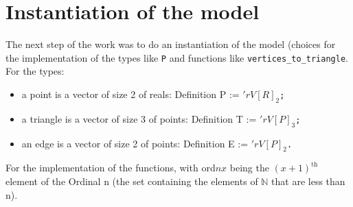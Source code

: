 \documentclass[a4paper,10pt]{article}
\def\definition#1#2{{\color{purple}Definition} {\color{blue}#1} := {\tt #2}}
\begin{document}
\section{Instantiation of the model}
\label{implementation}
The next step of the work was to do an instantiation of the model (choices for the implementation of the types like {\tt P} and functions like {\tt vertices\_to\_triangle}. For the types:
\begin{itemize}
\item a point is a vector of size 2 of reals: \definition{P}{$'rV[R]_2$; }
\item a triangle is a vector of size 3 of points: \definition{T}{$'rV[P]_3$; }
\item an edge is a vector of size 2 of points: \definition{E}{$'rV[P]_2$. }
\end{itemize}
For the implementation of the functions, with ord$nx$ being the $(x+1)^{\text{th}}$ element of the Ordinal n (the set containing the elements of $\mathbb{N}$ that are less than n).
\end{document}
